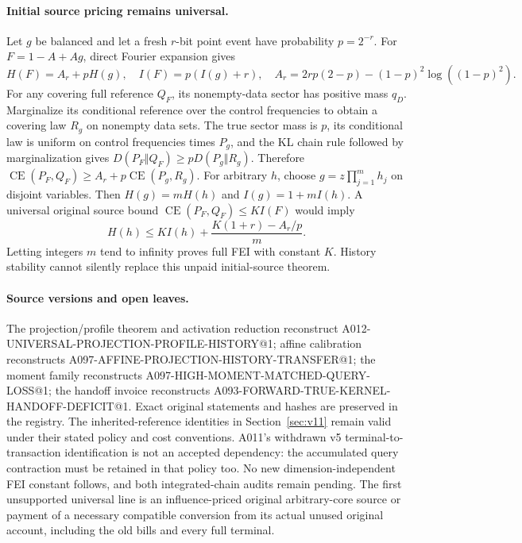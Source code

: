 \paragraph{Initial source pricing remains universal.}
Let $g$ be balanced and let a fresh $r$-bit point event have probability $p=2^{-r}$.
For $F=1-A+Ag$, direct Fourier expansion gives
\[
 H(F)=A_r+pH(g),\quad I(F)=p(I(g)+r),\quad
 A_r=2rp(2-p)-(1-p)^2\log((1-p)^2).
\]
For any covering full reference $Q_F$, its nonempty-data sector has positive mass
$q_D$. Marginalize its conditional reference over the control frequencies to obtain
a covering law $R_g$ on nonempty data sets. The true sector mass is $p$, its
conditional law is uniform on control frequencies times $P_g$, and the KL chain rule
followed by marginalization gives $D(P_F\Vert Q_F)\geq pD(P_g\Vert R_g)$.
Therefore
$\operatorname{CE}(P_F,Q_F)\geq A_r+p\operatorname{CE}(P_g,R_g)$.
For arbitrary $h$, choose $g=z\prod_{j=1}^m h_j$ on disjoint variables. Then
$H(g)=mH(h)$ and $I(g)=1+mI(h)$.
A universal original source bound $\operatorname{CE}(P_F,Q_F)\leq KI(F)$ would imply
\[
 H(h)\leq KI(h)+\frac{K(1+r)-A_r/p}{m}.
\]
Letting integers $m$ tend to infinity proves full FEI with constant $K$.
History stability cannot silently replace this unpaid initial-source theorem.

\paragraph{Source versions and open leaves.}
The projection/profile theorem and activation reduction reconstruct
A012-UNIVERSAL-PROJECTION-PROFILE-HISTORY@1; affine calibration reconstructs
A097-AFFINE-PROJECTION-HISTORY-TRANSFER@1; the moment family reconstructs
A097-HIGH-MOMENT-MATCHED-QUERY-LOSS@1; the handoff invoice reconstructs
A093-FORWARD-TRUE-KERNEL-HANDOFF-DEFICIT@1. Exact original statements and hashes
are preserved in the registry. The inherited-reference identities in
Section~\ref{sec:v11} remain valid under their stated policy and cost conventions.
A011's withdrawn v5 terminal-to-transaction identification is not an accepted
dependency: the accumulated query contraction must be retained in that policy too.
No new dimension-independent FEI constant follows, and both integrated-chain audits
remain pending. The first unsupported universal line is an influence-priced original
arbitrary-core source or payment of a necessary compatible conversion from its actual
unused original account, including the old bills and every full terminal.
